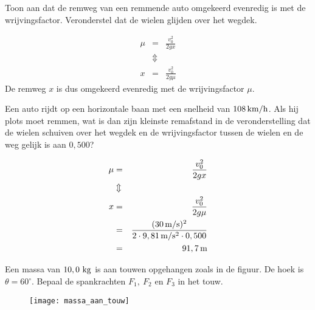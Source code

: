 \begin{exercise} Toon aan dat de remweg van een remmende auto omgekeerd
evenredig is met de wrijvingsfactor. Veronderstel dat de wielen
glijden over het wegdek.
\begin{oplossing}
\begin{eqnarray*}
\mu&=&\frac{v_0^2}{2gx}\\
&\Updownarrow&\\
x&=&\frac{v_0^2}{2g\mu}
\end{eqnarray*}
De remweg $x$ is dus omgekeerd evenredig met de wrijvingsfactor $\mu$.
\end{oplossing}

\end{exercise}

\begin{exercise} Een auto rijdt op een horizontale baan met een snelheid van
$108\rm\,km/h$. Als hij plots moet remmen, wat is dan zijn kleinste
remafstand in de veronderstelling dat de wielen schuiven over het
wegdek en de wrijvingsfactor tussen de wielen en de weg gelijk is
aan $0,500$?
\begin{oplossing}
\begin{eqnarray*}
\mu&=&\frac{v_0^2}{2gx}\\
&\Updownarrow&\\
x&=&\frac{v_0^2}{2g\mu}\\
&=&\frac{(30\rm\,m/s)^2}{2\cdot9,81\rm\,m/s^2\cdot0,500}\\
&=&91,7\rm\,m
\end{eqnarray*}
\end{oplossing}


\end{exercise}

\begin{exercise} Een massa van $10,0~\rm kg$ is aan touwen opgehangen zoals in de figuur. De hoek is $\theta=60^\circ$. Bepaal de spankrachten $F_1,~F_2$ en $F_3$ in het touw.
\begin{figure}[h]
\begin{center}
\texttt{[image: massa\_aan\_touw]}
\end{center}
\end{figure}




\end{exercise}

